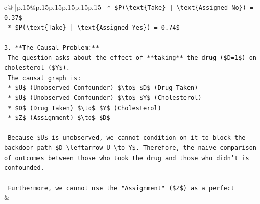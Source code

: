 \documentclass{article}
\begin{document}
{\begin{supertabular}{c@{$\;$}|p{.15\linewidth}@{}p{.15\linewidth}p{.15\linewidth}p{.15\linewidth}p{.15\linewidth}p{.15\linewidth}}
{{{\texttt{    *   \$P(\textbackslash{}text\{Take\} | \textbackslash{}text\{Assigned No\}) = 0.37\$} \\
\texttt{    *   \$P(\textbackslash{}text\{Take\} | \textbackslash{}text\{Assigned Yes\}) = 0.74\$} \\
\\ 
\texttt{3.  **The Causal Problem:**} \\
\texttt{    The question asks about the effect of **taking** the drug (\$D=1\$) on cholesterol (\$Y\$).} \\
\texttt{    The causal graph is:} \\
\texttt{    *   \$U\$ (Unobserved Confounder) \$\textbackslash{}to\$ \$D\$ (Drug Taken)} \\
\texttt{    *   \$U\$ (Unobserved Confounder) \$\textbackslash{}to\$ \$Y\$ (Cholesterol)} \\
\texttt{    *   \$D\$ (Drug Taken) \$\textbackslash{}to\$ \$Y\$ (Cholesterol)} \\
\texttt{    *   \$Z\$ (Assignment) \$\textbackslash{}to\$ \$D\$} \\
\\ 
\texttt{    Because \$U\$ is unobserved, we cannot condition on it to block the backdoor path \$D \textbackslash{}leftarrow U \textbackslash{}to Y\$. Therefore, the naive comparison of outcomes between those who took the drug and those who didn't is confounded.} \\
\\ 
\texttt{    Furthermore, we cannot use the "Assignment" (\$Z\$) as a perfect} \\
            }
        }
    }
    & \\ \\


\end{supertabular}}
\end{document}
